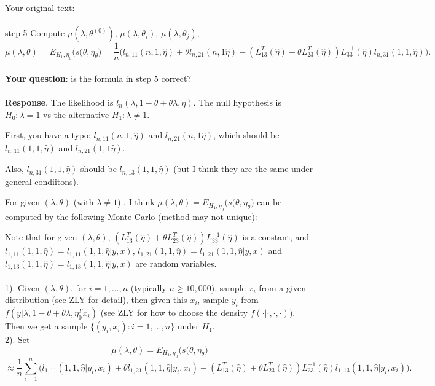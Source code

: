 \documentclass[a4,11pt,epsf, amssymb]{article}
\begin{document}
\def\ditem{\vspace{-0.1cm} \item}

\noindent Your original text:
\\\\
step 5 Compute $\mu(\lambda,\theta^{(0)})$, $\mu(\lambda,\theta_i)$, $\mu(\lambda,\theta_j)$,
$$ \mu(\lambda,\theta) = E_{H_1,\eta_0}\big(s(\theta,\eta_\theta\big) = \frac{1}{n}\big(l_{n,11}(n,1,\hat{\eta})
+\theta l_{n,21}(n,1\hat{\eta}) -(L^T_{13}(\hat{\eta})+\theta L^T_{23}(\hat{\eta}))L_{33}^{-1}(\hat{\eta})l_{n,31}(1,1,\hat{\eta})\big)
.$$
\\
{\bf Your question}:  is the formula in step 5 correct?
\\\\
{\bf Response}.  The likelihood is $l_n(\lambda,1-\theta+\theta\lambda,\eta)$. The null hypothesis is $H_0: \lambda=1$ vs the alternative $H_1: \lambda\neq 1$.

First, you have a typo: $l_{n,11}(n,1,\hat{\eta})$ and $l_{n,21}(n,1\hat{\eta})$, which should be $l_{n,11}(1,1,\hat{\eta})$ and $l_{n,21}(1,1\hat{\eta})$. 

Also, $l_{n,31}(1,1,\hat{\eta})$ should be $l_{n,13}(1,1,\hat{\eta})$ (but I think they are the same under general condiitons).


For given $(\lambda,\theta)$ (with $\lambda\neq 1$) , I think $\mu(\lambda,\theta) = E_{H_1,\eta_0}\big(s(\theta,\eta_\theta\big)$ can be computed by the following Monte Carlo (method may not unique):

Note that for given $(\lambda,\theta)$, $(L^T_{13}(\hat{\eta})+\theta L^T_{23}(\hat{\eta}))L_{33}^{-1}(\hat{\eta})$ is a constant,
and $l_{1,11}(1,1,\hat{\eta})=l_{1,11}(1,1,\hat{\eta}|y,x)$, $l_{1,21}(1,1,\hat{\eta})=l_{1,21}(1,1,\hat{\eta}|y,x)$ and $l_{1,13}(1,1,\hat{\eta})=l_{1,13}(1,1,\hat{\eta}|y,x)$ are random variables.
\\\\
 1).  Given $(\lambda,\theta)$, for $i=1,...,n$ (typically $n\geq 10,000$), sample $x_i$ from a given distribution (see ZLY for detail), then given this $x_i$, sample $y_i$ from $f(y|\lambda,1-\theta+\theta \lambda,\eta^T_0 x_i)$ (see ZLY for how to choose the density $f(\cdot|\cdot,\cdot,\cdot))$. Then we get a sample $\{(y_i,x_i): i=1,...,n\}$ under $H_1$. 
 \\
 2). Set
 $$ \mu(\lambda,\theta) = E_{H_1,\eta_0}\big(s(\theta,\eta_\theta\big) $$
 $$ \approx \frac{1}{n}\sum_{i=1}^n\Big(l_{1,11}(1,1,\hat{\eta}|y_i,x_i)
+\theta l_{1,21}(1,1,\hat{\eta}|y_i,x_i) -(L^T_{13}(\hat{\eta})+\theta L^T_{23}(\hat{\eta}))L_{33}^{-1}(\hat{\eta})l_{1,13}(1,1,\hat{\eta}|y_i,x_i)\Big). $$
\end{document}
